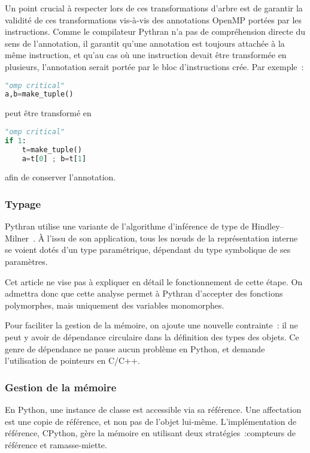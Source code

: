 \documentclass[renpar]{compas2013}
\begin{document}
Un point crucial à respecter lors de ces transformations d'arbre est de
garantir la validité de ces transformations vis-à-vis des annotations
OpenMP portées par les instructions. Comme le compilateur Pythran n'a pas
de compréhension directe du sens de l'annotation, il garantit qu'une
annotation est toujours attachée à la même instruction, et qu'au cas où
une instruction devait être transformée en plusieurs, l'annotation serait
portée par le bloc d'instructions crée. Par exemple~:
%
\begin{lstlisting}[language=python]
"omp critical"
a,b=make_tuple()
\end{lstlisting}
%
\noindent peut être transformé en
\begin{lstlisting}[language=python]
"omp critical"
if 1:
	t=make_tuple()
	a=t[0] ; b=t[1]
\end{lstlisting}
%
\noindent afin de conserver l'annotation.

\subsubsection{Typage}

Pythran utilise une variante de l'algorithme d'inférence de type de
Hindley--Milner~\cite{milner78}. À l'issu de son application, tous les
nœuds de la représentation interne se voient dotés d'un type paramétrique,
dépendant du type symbolique de ses paramètres.

Cet article ne vise pas à expliquer en détail le fonctionnement de cette
étape. On admettra donc que cette analyse permet à Pythran d'accepter des
fonctions polymorphes, mais uniquement des variables monomorphes.

Pour faciliter la gestion de la mémoire, on ajoute une nouvelle
contrainte~: il ne peut y avoir de dépendance circulaire dans la
définition des types des objets. Ce genre de dépendance ne pause aucun
problème en Python, et demande l'utilisation de pointeurs en C/C++.

\subsubsection{Gestion de la mémoire}

En Python, une instance de classe est accessible via sa référence. Une
affectation est une copie de référence, et non pas de l'objet lui-même.
L'implémentation de référence, CPython, gère la mémoire en utilisant deux
stratégies~:compteurs de référence et ramasse-miette.
\end{document}
